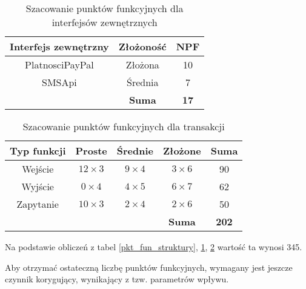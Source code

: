 \documentclass[12pt,leqno,twoside]{mwart}
\begin{document}
\begin{table}[h]
	\centering
	\caption{Szacowanie punktów funkcyjnych dla interfejsów zewnętrznych}
		\rule{0pt}{3ex}
		\begin{tabular}{c|c|c|}
		\hline
		\multicolumn{1}{|c|}{\textbf{Interfejs zewnętrzny}} & \textbf{Złożoność} & \textbf{NPF} \\ \hline
		\multicolumn{1}{|c|}{PlatnosciPayPal} 	& Złożona 	& 10 \\ \hline
		\multicolumn{1}{|c|}{SMSApi} 		& Średnia 	& 7 \\ \hline
					& \textbf{Suma}	& \textbf{17} \\ \cline{2-3}
		\end{tabular}
	\label{pkt_fun_zew}
\end{table}
\begin{table}[h]
	\centering
	\caption{Szacowanie punktów funkcyjnych dla transakcji}
		\rule{0pt}{3ex}
		\begin{tabular}{ccc|c|c|}
		\hline
		\multicolumn{1}{|c|}{\textbf{Typ funkcji}}	& \multicolumn{1}{c|}{\textbf{Proste}}	& \textbf{Średnie} &	\textbf{Złożone} &	\textbf{Suma} \\ \hline
		\multicolumn{1}{|c|}{Wejście} 		& \multicolumn{1}{c|}{$12 \times 3$} & $9 \times 4$ & $3 \times 6$ & 90 \\ \hline
		\multicolumn{1}{|c|}{Wyjście}		& \multicolumn{1}{c|}{$0 \times 4$} & $4 \times 5$ & $6 \times 7$ & 62 \\ \hline
		\multicolumn{1}{|c|}{Zapytanie}		& \multicolumn{1}{c|}{$10 \times 3$} & $2 \times 4$ & $2 \times 6$ & 50 \\ \hline
			&	&	& \textbf{Suma}	& \textbf{202} \\ \cline{4-5}
		\end{tabular}
	\label{pkt_fun_trans}
\end{table}
Na podstawie obliczeń z tabel \ref{pkt_fun_struktury}, \ref{pkt_fun_zew}, \ref{pkt_fun_trans} wartość ta wynosi 345.

Aby otrzymać ostateczną liczbę punktów funkcyjnych, wymagany jest jeszcze czynnik korygujący, wynikający z tzw. parametrów wpływu.
\end{document}

